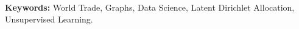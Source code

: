 \chapter*{\runtitle}

\noindent {}

\bigskip

\noindent\textbf{Keywords:} World Trade, Graphs, Data Science, Latent Dirichlet Allocation, Unsupervised Learning.